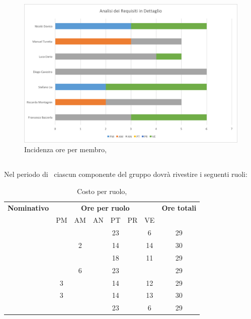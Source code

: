 \begin{figure}[H]
	\centering 
	\includegraphics[scale=0.7]{Immagini/GraficiPianoLavoro/ARD.png}
	\caption{Incidenza ore per membro, \ARD}
\end{figure}

\newpage
\subsection{\PA}
Nel periodo di \PA\ ciascun componente del gruppo dovrà rivestire i seguenti ruoli:

\begin{table}[h]
	\begin{center}
		\begin{tabular}{|c|c|c|c|c|c|c|c|}
			\hline
			\textbf{Nominativo} & \multicolumn{6}{c|}{\textbf{Ore per ruolo}} & \textbf{Ore totali} \\
					& PM & AM & AN & PT & PR & VE & \\
			\hline
			\FB		&	 &	  &	   & 23	&	 & 6  &	29	\\
			\hline
			\RM		&	 & 2  &	   & 14	&  	 & 14 & 30	\\
			\hline
			\SL		&	 &	  &	   & 18	&	 & 11 &	29	\\
			\hline
			\DC		&	 & 6  &	   & 23	&	 & 	  &	29	\\
			\hline
			\LD 	& 3	 &	  &	   & 14	&	 & 12 &	29	\\
			\hline
			\MT		& 3	 &	  &	   & 14	&	 & 13 &	30	\\
			\hline
			\ND 	&	 &	  &	   & 23	&	 & 6  & 29	\\
			\hline
		\end{tabular}
	\end{center}
	\caption{Costo per ruolo, \PA}
\end{table}

